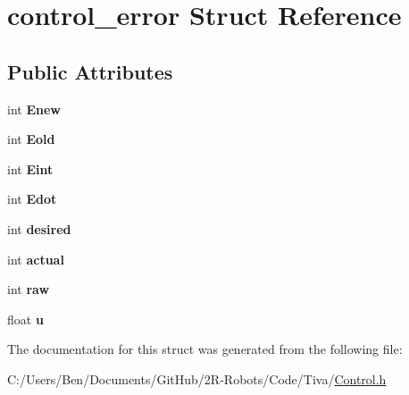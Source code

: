 \hypertarget{structcontrol__error}{}\section{control\+\_\+error Struct Reference}
\label{structcontrol__error}
\subsection*{Public Attributes}
\begin{DoxyCompactItemize}
\item 
\mbox{\label{structcontrol__error_a520d0aa203dfb6a8fc2ef6ea67742634}} 
int {\bfseries Enew}
\item 
\mbox{\label{structcontrol__error_a544db3cda64df9fdd64338941e583d3c}} 
int {\bfseries Eold}
\item 
\mbox{\label{structcontrol__error_a0134001840bac616204e9b36ce7fc53e}} 
int {\bfseries Eint}
\item 
\mbox{\label{structcontrol__error_a5a4f2cb0d9739ecbc2391462d4b0f07d}} 
int {\bfseries Edot}
\item 
\mbox{\label{structcontrol__error_a50083d46933f91ac7af1ab23eda49ddb}} 
int {\bfseries desired}
\item 
\mbox{\label{structcontrol__error_a45eeafb4f62fb62128e4f1dde8b134db}} 
int {\bfseries actual}
\item 
\mbox{\label{structcontrol__error_a872f13c1886cb584b7043e668b188548}} 
int {\bfseries raw}
\item 
\mbox{\label{structcontrol__error_acf5c228017b873e0db8d1e5a4c6cd87c}} 
float {\bfseries u}
\end{DoxyCompactItemize}


The documentation for this struct was generated from the following file\+:\begin{DoxyCompactItemize}
\item 
C\+:/\+Users/\+Ben/\+Documents/\+Git\+Hub/2\+R-\/\+Robots/\+Code/\+Tiva/\mbox{\hyperlink{_control_8h}{Control.\+h}}\end{DoxyCompactItemize}
